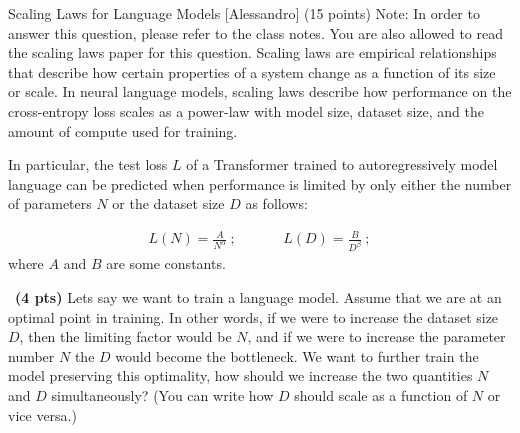 \begin{question}{Scaling Laws for Language Models  [Alessandro] (15 points)}
Note: In order to answer this question, please refer to the class notes. You are also allowed to read the scaling laws paper \cite{kaplan} for this question.
Scaling laws are empirical relationships that describe how certain properties of a system change as a function of its size or scale. In neural language models, scaling laws describe how performance on the cross-entropy loss scales as a power-law with model size, dataset size, and the amount of compute used for training.


In particular, the test loss $L$ of a Transformer trained to autoregressively model language can be predicted when performance is limited by only either the number of parameters $N$ or the dataset size $D$ as follows:

\begin{align}
    \label{powerlaw}
     L(N) = \frac{A}{N^{\alpha}}\ ;  \hspace{40pt} 
     L(D) = \frac{B}{D^{\beta}}\ ; 
\end{align}
where $A$ and $B$ are some constants. 

\begin{subquestion}{~\small \textbf{(4 pts)}}
    \label{subq:a}
    Lets say we want to train a language model. Assume that we are at an optimal point in training. In other words, if we were to increase the dataset size $D$, then the limiting factor would be $N$, and if we were to increase the parameter number $N$ the $D$ would become the bottleneck. We want to further train the model preserving this optimality, how should we increase the two quantities $N$ and $D$ simultaneously? (You can write how $D$ should scale as a function of $N$ or vice versa.)

\end{subquestion}





\end{question}
